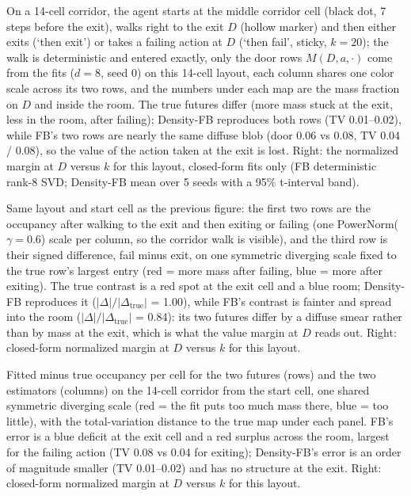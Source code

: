 On a 14-cell corridor, the agent starts at the middle corridor cell (black dot, 7 steps before the exit), walks right to the exit $D$ (hollow marker) and then either exits (`then exit') or takes a failing action at $D$ (`then fail', sticky, $k{=}20$); the walk is deterministic and entered exactly, only the door rows $M(D,a,\cdot)$ come from the fits ($d{=}8$, seed 0) on this 14-cell layout, each column shares one color scale across its two rows, and the numbers under each map are the mass fraction on $D$ and inside the room. The true futures differ (more mass stuck at the exit, less in the room, after failing); Density-FB reproduces both rows (TV 0.01--0.02), while FB's two rows are nearly the same diffuse blob (door 0.06 vs 0.08, TV 0.04 / 0.08), so the value of the action taken at the exit is lost. Right: the normalized margin at $D$ versus $k$ for this layout, closed-form fits only (FB deterministic rank-8 SVD; Density-FB mean over 5 seeds with a 95\% t-interval band).

Same layout and start cell as the previous figure: the first two rows are the occupancy after walking to the exit and then exiting or failing (one PowerNorm($\gamma{=}0.6$) scale per column, so the corridor walk is visible), and the third row is their signed difference, fail minus exit, on one symmetric diverging scale fixed to the true row's largest entry (red = more mass after failing, blue = more after exiting). The true contrast is a red spot at the exit cell and a blue room; Density-FB reproduces it ($|\Delta|/|\Delta_{\mathrm{true}}|$ = 1.00), while FB's contrast is fainter and spread into the room ($|\Delta|/|\Delta_{\mathrm{true}}|$ = 0.84): its two futures differ by a diffuse smear rather than by mass at the exit, which is what the value margin at $D$ reads out. Right: closed-form normalized margin at $D$ versus $k$ for this layout.

Fitted minus true occupancy per cell for the two futures (rows) and the two estimators (columns) on the 14-cell corridor from the start cell, one shared symmetric diverging scale (red = the fit puts too much mass there, blue = too little), with the total-variation distance to the true map under each panel. FB's error is a blue deficit at the exit cell and a red surplus across the room, largest for the failing action (TV 0.08 vs 0.04 for exiting); Density-FB's error is an order of magnitude smaller (TV 0.01--0.02) and has no structure at the exit. Right: closed-form normalized margin at $D$ versus $k$ for this layout.
